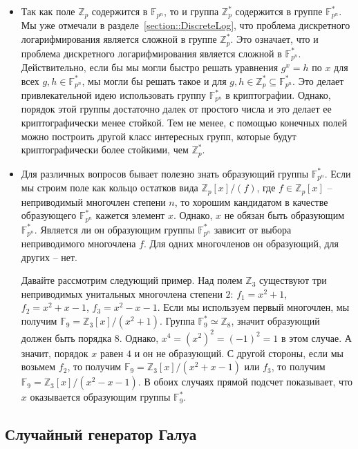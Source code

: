 \begin{remarks}
\begin{itemize}
\item 
Так как поле $\mathbb Z_p$ содержится в $\mathbb F_{p^n}$, то и группа $\mathbb Z_p^*$ содержится в группе $\mathbb F_{p^n}^*$.
Мы уже отмечали в разделе~\ref{section::DiscreteLog}, что проблема дискретного логарифмирования является сложной в группе $\mathbb Z_p^*$.
Это означает, что и проблема дискретного логарифмирования является сложной в $\mathbb F_{p^n}^*$.
Действительно, если бы мы могли быстро решать уравнения $g^x = h$ по $x$ для всех $g,h \in \mathbb F_{p^n}^*$, мы могли бы решать такое и для $g, h\in \mathbb Z_p^* \subseteq \mathbb F_{p^n}^*$.
Это делает привлекательной идею использовать группу $\mathbb F_{p^n}^*$ в криптографии.
Однако, порядок этой группы достаточно далек от простого числа и это делает ее криптографически менее стойкой.
Тем не менее, с помощью конечных полей можно построить другой класс интересных групп, которые будут криптографически более стойкими, чем $\mathbb Z_p^*$.

\item
Для различных вопросов бывает полезно знать образующий группы $\mathbb F_{p^n}^*$.
Если мы строим поле как кольцо остатков вида $\mathbb Z_p[x]/(f)$, где $f\in \mathbb Z_p[x]$ -- неприводимый многочлен степени $n$, то хорошим кандидатом в качестве образующего $\mathbb F_{p^n}^*$ кажется элемент $x$.
Однако, $x$ не обязан быть образующим $\mathbb F_{p^n}^*$.
Является ли он образующим группы $\mathbb F_{p^n}^*$ зависит от выбора неприводимого многочлена $f$.
Для одних многочленов он образующий, для других -- нет.

Давайте рассмотрим следующий пример.
Над полем $\mathbb Z_3$ существуют три неприводимых унитальных многочлена степени $2$: $f_1 = x^2+1$, $f_2 = x^2 + x - 1$, $f_3 = x^2 - x - 1$.
Если мы используем первый многочлен, мы получим $\mathbb F_9 = \mathbb Z_3[x]/(x^2 + 1)$.
Группа $\mathbb F_9^* \simeq \mathbb Z_8$, значит образующий должен быть порядка $8$.
Однако, $x^4 = (x^2)^2=(-1)^2 = 1$ в этом случае.
А значит, порядок $x$ равен $4$ и он не образующий.
С другой стороны, если мы возьмем $f_2$, то получим $\mathbb F_9 = \mathbb Z_3[x]/(x^2+x-1)$ или $f_3$, то получим $\mathbb F_9 = \mathbb Z_3[x]/(x^2-x-1)$.
В обоих случаях прямой подсчет показывает, что $x$ оказывается образующим группы $\mathbb F_9^*$.
\end{itemize}
\end{remarks}

\subsection{Случайный генератор Галуа}

